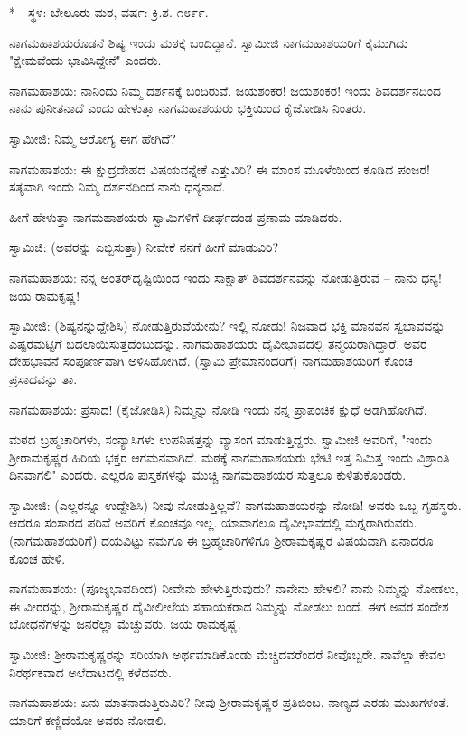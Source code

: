 \begin{center}
* - ಸ್ಥಳ: ಬೇಲೂರು ಮಠ, ವರ್ಷ: ಕ್ರಿ.ಶ. ೧೮೯೯.
\end{center}

ನಾಗಮಹಾಶಯರೊಡನೆ ಶಿಷ್ಯ ಇಂದು ಮಠಕ್ಕೆ ಬಂದಿದ್ದಾನೆ. ಸ್ವಾಮೀಜಿ ನಾಗಮಹಾಶಯರಿಗೆ ಕೈಮುಗಿದು "ಕ್ಷೇಮವೆಂದು ಭಾವಿಸಿದ್ದೇನೆ" ಎಂದರು.

ನಾಗಮಹಾಶಯ: ನಾನಿಂದು ನಿಮ್ಮ ದರ್ಶನಕ್ಕೆ ಬಂದಿರುವೆ. ಜಯಶಂಕರ! ಜಯಶಂಕರ! ಇಂದು ಶಿವದರ್ಶನದಿಂದ ನಾನು ಪುನೀತನಾದೆ ಎಂದು ಹೇಳುತ್ತಾ ನಾಗಮಹಾಶಯರು ಭಕ್ತಿಯಿಂದ ಕೈಜೋಡಿಸಿ ನಿಂತರು.

ಸ್ವಾಮೀಜಿ: ನಿಮ್ಮ ಆರೋಗ್ಯ ಈಗ ಹೇಗಿದೆ?

ನಾಗಮಹಾಶಯ: ಈ ಕ್ಷುದ್ರದೇಹದ ವಿಷಯವನ್ನೇಕೆ ಎತ್ತುವಿರಿ? ಈ ಮಾಂಸ ಮೂಳೆಯಿಂದ ಕೂಡಿದ ಪಂಜರ! ಸತ್ಯವಾಗಿ ಇಂದು ನಿಮ್ಮ ದರ್ಶನದಿಂದ ನಾನು ಧನ್ಯನಾದೆ.

ಹೀಗೆ ಹೇಳುತ್ತಾ ನಾಗಮಹಾಶಯರು ಸ್ವಾಮಿಗಳಿಗೆ ದೀರ್ಘದಂಡ ಪ್ರಣಾಮ ಮಾಡಿದರು.

ಸ್ವಾಮಿಜಿ: (ಅವರನ್ನು ಎಬ್ಬಿಸುತ್ತಾ) ನೀವೇಕೆ ನನಗೆ ಹೀಗೆ ಮಾಡುವಿರಿ?

ನಾಗಮಹಾಶಯ: ನನ್ನ ಅಂತರ್‌ದೃಷ್ಟಿಯಿಂದ ಇಂದು ಸಾಕ್ಷಾತ್ ಶಿವದರ್ಶನವನ್ನು ನೋಡುತ್ತಿರುವೆ – ನಾನು ಧನ್ಯ! ಜಯ ರಾಮಕೃಷ್ಣ!

ಸ್ವಾಮೀಜಿ: (ಶಿಷ್ಯನನ್ನುದ್ದೇಶಿಸಿ) ನೋಡುತ್ತಿರುವೆಯೇನು? ಇಲ್ಲಿ ನೋಡು! ನಿಜವಾದ ಭಕ್ತಿ ಮಾನವನ ಸ್ವಭಾವವನ್ನು ಎಷ್ಟರಮಟ್ಟಿಗೆ ಬದಲಾಯಿಸುತ್ತದೆಂಬುದನ್ನು. ನಾಗಮಹಾಶಯರು ದೈವೀಭಾವದಲ್ಲಿ ತನ್ಮಯರಾಗಿದ್ದಾರೆ. ಅವರ ದೇಹಭಾವನೆ ಸಂಪೂರ್ಣವಾಗಿ ಅಳಿಸಿಹೋಗಿದೆ. (ಸ್ವಾಮಿ ಪ್ರೇಮಾನಂದರಿಗೆ) ನಾಗಮಹಾಶಯರಿಗೆ ಕೊಂಚ ಪ್ರಸಾದವನ್ನು ತಾ.

ನಾಗಮಹಾಶಯ: ಪ್ರಸಾದ! (ಕೈಜೋಡಿಸಿ) ನಿಮ್ಮನ್ನು ನೋಡಿ ಇಂದು ನನ್ನ ಪ್ರಾಪಂಚಿಕ ಕ್ಷುಧೆ ಅಡಗಿಹೋಗಿದೆ.

ಮಠದ ಬ್ರಹ್ಮಚಾರಿಗಳು, ಸಂನ್ಯಾಸಿಗಳು ಉಪನಿಷತ್ತನ್ನು ವ್ಯಾಸಂಗ ಮಾಡುತ್ತಿದ್ದರು. ಸ್ವಾಮೀಜಿ ಅವರಿಗೆ, "ಇಂದು ಶ‍್ರೀರಾಮಕೃಷ್ಣರ ಹಿರಿಯ ಭಕ್ತರ ಆಗಮನವಾಗಿದೆ. ಮಠಕ್ಕೆ ನಾಗಮಹಾಶಯರು ಭೇಟಿ ಇತ್ತ ನಿಮಿತ್ತ ಇಂದು ವಿಶ್ರಾಂತಿ ದಿನವಾಗಲಿ" ಎಂದರು. ಎಲ್ಲರೂ ಪುಸ್ತಕಗಳನ್ನು ಮುಚ್ಚಿ ನಾಗಮಹಾಶಯರ ಸುತ್ತಲೂ ಕುಳಿತುಕೊಂಡರು.

ಸ್ವಾಮೀಜಿ: (ಎಲ್ಲರನ್ನೂ ಉದ್ದೇಶಿಸಿ) ನೀವು ನೋಡುತ್ತಿಲ್ಲವೆ? ನಾಗಮಹಾಶಯರನ್ನು ನೋಡಿ! ಅವರು ಒಬ್ಬ ಗೃಹಸ್ಥರು. ಆದರೂ ಸಂಸಾರದ ಪರಿವೆ ಅವರಿಗೆ ಕೊಂಚವೂ ಇಲ್ಲ. ಯಾವಾಗಲೂ ದೈವೀಭಾವದಲ್ಲಿ ಮಗ್ನರಾಗಿರುವರು. (ನಾಗಮಹಾಶಯರಿಗೆ) ದಯವಿಟ್ಟು ನಮಗೂ ಈ ಬ್ರಹ್ಮಚಾರಿಗಳಿಗೂ ಶ‍್ರೀರಾಮಕೃಷ್ಣರ ವಿಷಯವಾಗಿ ಏನಾದರೂ ಕೊಂಚ ಹೇಳಿ.

ನಾಗಮಹಾಶಯ: (ಪೂಜ್ಯಭಾವದಿಂದ) ನೀವೇನು ಹೇಳುತ್ತಿರುವುದು? ನಾನೇನು ಹೇಳಲಿ? ನಾನು ನಿಮ್ಮನ್ನು ನೋಡಲು, ಈ ವೀರರನ್ನು, ಶ‍್ರೀರಾಮಕೃಷ್ಣರ ದೈವೀಲೀಲೆಯ ಸಹಾಯಕರಾದ ನಿಮ್ಮನ್ನು ನೋಡಲು ಬಂದೆ. ಈಗ ಅವರ ಸಂದೇಶ ಬೋಧನೆಗಳನ್ನು ಜನರೆಲ್ಲಾ ಮೆಚ್ಚುವರು. ಜಯ ರಾಮಕೃಷ್ಣ.

ಸ್ವಾಮೀಜಿ: ಶ‍್ರೀರಾಮಕೃಷ್ಣರನ್ನು ಸರಿಯಾಗಿ ಅರ್ಥಮಾಡಿಕೊಂಡು ಮೆಚ್ಚಿದವರೆಂದರೆ ನೀವೊಬ್ಬರೇ. ನಾವೆಲ್ಲಾ ಕೇವಲ ನಿರರ್ಥಕವಾದ ಅಲೆದಾಟದಲ್ಲಿ ಕಳೆದವರು.

ನಾಗಮಹಾಶಯ: ಏನು ಮಾತನಾಡುತ್ತಿರುವಿರಿ? ನೀವು ಶ‍್ರೀರಾಮಕೃಷ್ಣರ ಪ್ರತಿಬಿಂಬ. ನಾಣ್ಯದ ಎರಡು ಮುಖಗಳಂತೆ. ಯಾರಿಗೆ ಕಣ್ಣಿದೆಯೋ ಅವರು ನೋಡಲಿ.

